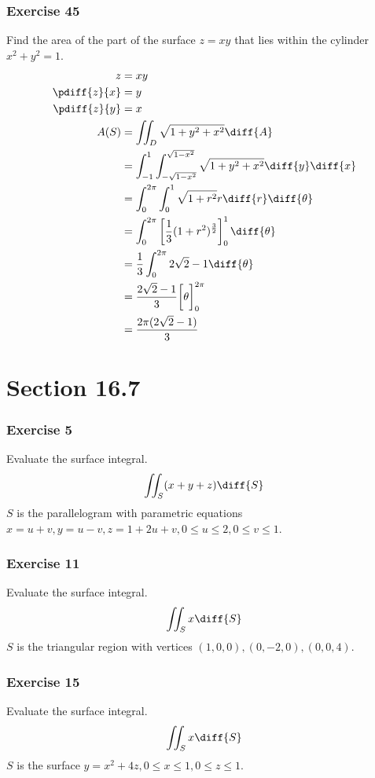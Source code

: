 \documentclass{math}
\begin{document}
\subsubsection*{Exercise 45}
Find the area of the part of the surface \( z = xy \) that lies within the
cylinder \( x^2+y^2 = 1 \).
\begin{align*}
  z &= xy \\
  \pdiff{z}{x} &= y \\
  \pdiff{z}{y} &= x \\
  A(S) &= \iint_{D}\sqrt{1+y^2+x^2}\diff{A} \\
  &= \int_{-1}^{1}\int_{-\sqrt{1-x^2}}^{\sqrt{1-x^2}}\sqrt{1+y^2+x^2}
    \diff{y}\diff{x} \\
  &= \int_{0}^{2\pi}\int_{0}^{1}\sqrt{1+r^2}r\diff{r}\diff{\theta} \\
  &= \int_{0}^{2\pi}\left[\frac{1}{3}(1+r^2)^{\frac{3}{2}}\right]_{0}^{1}
    \diff{\theta} \\
  &= \frac{1}{3}\int_{0}^{2\pi}2\sqrt{2}-1\diff{\theta} \\
  &= \frac{2\sqrt{2}-1}{3}\bigg[\theta\bigg]_{0}^{2\pi} \\
  &= \frac{2\pi(2\sqrt{2}-1)}{3}
\end{align*}

\section*{Section 16.7}

\subsubsection*{Exercise 5}
Evaluate the surface integral.
\[ \iint_{S}(x+y+z)\diff{S} \]
\( S \) is the parallelogram with parametric equations \( x = u+v, y = u-v,
z = 1+2u+v, 0\le u\le 2, 0\le v\le 1 \).

\subsubsection*{Exercise 11}
Evaluate the surface integral.
\[ \iint_{S}x\diff{S} \]
\( S \) is the triangular region with vertices \( (1,0,0),(0,-2,0),(0,0,4) \).

\subsubsection*{Exercise 15}
Evaluate the surface integral.
\[ \iint_{S}x\diff{S} \]
\( S \) is the surface \( y = x^2+4z,0\le x\le1,0\le z\le 1 \).
\end{document}
